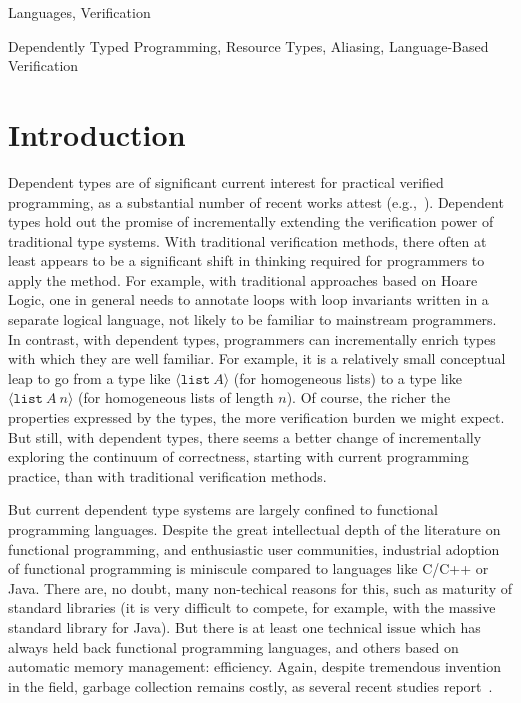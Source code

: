 \documentclass[9pt,natbib]{sigplanconf}
\begin{document}
\terms
Languages, Verification

\keywords
Dependently Typed Programming, Resource Types, Aliasing, Language-Based Verification

\section{Introduction}

Dependent types are of significant current interest for practical
verified programming, as a substantial number of recent works attest
(e.g.,~\cite{oury+08,norell07,pasalic+07,sheard06,nanevski+08,licata+05,chenxi05}).
Dependent types hold out the promise of incrementally extending the
verification power of traditional type systems.  With traditional
verification methods, there often at least appears to be a significant
shift in thinking required for programmers to apply the method.  For
example, with traditional approaches based on Hoare Logic, one in
general needs to annotate loops with loop invariants written in a
separate logical language, not likely to be familiar to mainstream
programmers.  In contrast, with dependent types, programmers can
incrementally enrich types with which they are well familiar.  For
example, it is a relatively small conceptual leap to go from a type
like $\langle \texttt{list}\ A\rangle$ (for homogeneous lists) to a
type like $\langle \texttt{list}\ A\ n\rangle$ (for homogeneous lists
of length $n$).  Of course, the richer the properties expressed by the
types, the more verification burden we might expect.  But still, with
dependent types, there seems a better change of incrementally
exploring the continuum of correctness, starting with current
programming practice, than with traditional verification methods.

But current dependent type systems are largely confined to functional
programming languages.  Despite the great intellectual depth of the
literature on functional programming, and enthusiastic user
communities, industrial adoption of functional programming is
miniscule compared to languages like C/C++ or Java.  There are, no
doubt, many non-techical reasons for this, such as maturity of
standard libraries (it is very difficult to compete, for example, with
the massive standard library for Java).  But there is at least one
technical issue which has always held back functional programming
languages, and others based on automatic memory management:
efficiency.  Again, despite tremendous invention in the field, garbage
collection remains costly, as several recent studies
report~\cite{Xian2008,hertz+05}.
\end{document}
